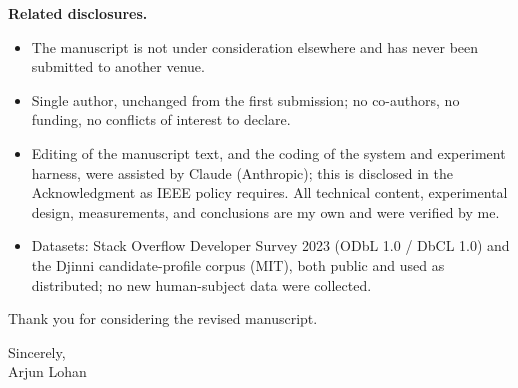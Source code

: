 \documentclass[10.5pt]{article}
\begin{document}
\textbf{Related disclosures.}
\begin{itemize}
\item The manuscript is not under consideration elsewhere and has never been submitted to another venue.
\item Single author, unchanged from the first submission; no co-authors, no funding, no conflicts of interest to declare.
\item Editing of the manuscript text, and the coding of the system and experiment harness, were assisted by Claude (Anthropic); this is disclosed in the Acknowledgment as IEEE policy requires. All technical content, experimental design, measurements, and conclusions are my own and were verified by me.
\item Datasets: Stack Overflow Developer Survey 2023 (ODbL 1.0 / DbCL 1.0) and the Djinni candidate-profile corpus (MIT), both public and used as distributed; no new human-subject data were collected.
\end{itemize}

Thank you for considering the revised manuscript.

Sincerely,\\[0.3em]
Arjun Lohan
\end{document}
